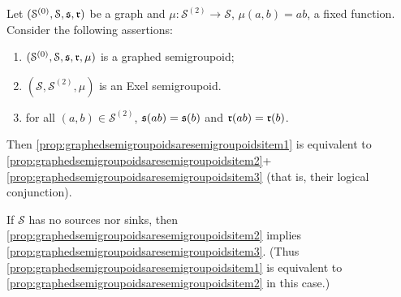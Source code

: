 \begin{proposition}\label{prop:graphedsemigroupoidsaresemigroupoids}
Let $(\mathcal{S}^{(0)},\mathcal{S},\operatorname{\mathfrak{s}},\operatorname{\mathfrak{r}})$ be a graph and $\mu\colon\mathcal{S}^{(2)}\to \mathcal{S}$, $\mu(a,b)=ab$, a fixed function. Consider the following assertions:
\begin{enumerate}[label=(\arabic*)]
    \item\label{prop:graphedsemigroupoidsaresemigroupoidsitem1} $(\mathcal{S}^{(0)},\mathcal{S},\operatorname{\mathfrak{s}},\operatorname{\mathfrak{r}},\mu)$ is a graphed semigroupoid;
    \item\label{prop:graphedsemigroupoidsaresemigroupoidsitem2} $(\mathcal{S},\mathcal{S}^{(2)},\mu)$ is an Exel semigroupoid.
    \item\label{prop:graphedsemigroupoidsaresemigroupoidsitem3} for all $(a,b)\in \mathcal{S}^{(2)}$, $\operatorname{\mathfrak{s}}(ab)=\operatorname{\mathfrak{s}}(b)$ and $\operatorname{\mathfrak{r}}(ab)=\operatorname{\mathfrak{r}}(b)$.
\end{enumerate}
Then \ref{prop:graphedsemigroupoidsaresemigroupoidsitem1} is equivalent to \ref{prop:graphedsemigroupoidsaresemigroupoidsitem2}+\ref{prop:graphedsemigroupoidsaresemigroupoidsitem3} (that is, their logical conjunction).

If $\mathcal{S}$ has no sources nor sinks, then \ref{prop:graphedsemigroupoidsaresemigroupoidsitem2} implies \ref{prop:graphedsemigroupoidsaresemigroupoidsitem3}. (Thus \ref{prop:graphedsemigroupoidsaresemigroupoidsitem1} is equivalent to \ref{prop:graphedsemigroupoidsaresemigroupoidsitem2} in this case.)
\end{proposition}
